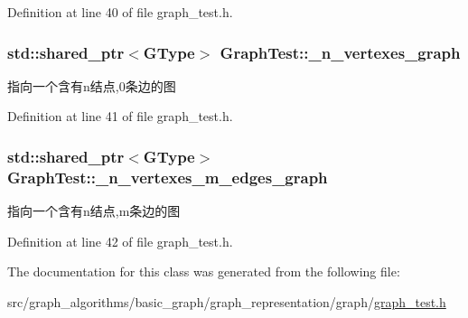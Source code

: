 Definition at line 40 of file graph\+\_\+test.\+h.

\hypertarget{class_graph_test_a2dac828599509e577b5406d06f613a16}{}
\subsubsection[{\+\_\+n\+\_\+vertexes\+\_\+graph}]{\setlength{\rightskip}{0pt plus 5cm}std\+::shared\+\_\+ptr$<${\bf G\+Type}$>$ Graph\+Test\+::\+\_\+n\+\_\+vertexes\+\_\+graph\hspace{0.3cm}{\ttfamily [protected]}}\label{class_graph_test_a2dac828599509e577b5406d06f613a16}
指向一个含有n结点,0条边的图 

Definition at line 41 of file graph\+\_\+test.\+h.

\hypertarget{class_graph_test_aaa662e57a6eb46a91c59464871b4907f}{}
\subsubsection[{\+\_\+n\+\_\+vertexes\+\_\+m\+\_\+edges\+\_\+graph}]{\setlength{\rightskip}{0pt plus 5cm}std\+::shared\+\_\+ptr$<${\bf G\+Type}$>$ Graph\+Test\+::\+\_\+n\+\_\+vertexes\+\_\+m\+\_\+edges\+\_\+graph\hspace{0.3cm}{\ttfamily [protected]}}\label{class_graph_test_aaa662e57a6eb46a91c59464871b4907f}
指向一个含有n结点,m条边的图 

Definition at line 42 of file graph\+\_\+test.\+h.



The documentation for this class was generated from the following file\+:\begin{DoxyCompactItemize}
\item 
src/graph\+\_\+algorithms/basic\+\_\+graph/graph\+\_\+representation/graph/\hyperlink{graph__test_8h}{graph\+\_\+test.\+h}\end{DoxyCompactItemize}
